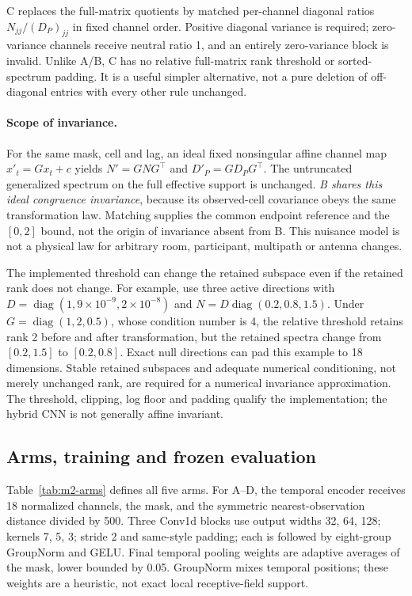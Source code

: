 C replaces the full-matrix quotients by matched per-channel diagonal ratios
$N_{jj}/(D_P)_{jj}$ in fixed channel order. Positive diagonal variance is
required; zero-variance channels receive neutral ratio 1, and an entirely
zero-variance block is invalid. Unlike A/B, C has no relative full-matrix
rank threshold or sorted-spectrum padding. It is a useful simpler alternative,
not a pure deletion of off-diagonal entries with every other rule unchanged.

\paragraph{Scope of invariance.}
For the same mask, cell and lag, an ideal fixed nonsingular affine channel
map $x'_t=Gx_t+c$ yields $N'=GNG^\top$ and $D'_P=GD_PG^\top$.
The untruncated generalized spectrum on the full effective support is
unchanged. \emph{B shares this ideal congruence invariance}, because its
observed-cell covariance obeys the same transformation law. Matching supplies
the common endpoint reference and the $[0,2]$ bound, not the origin of
invariance absent from B. This nuisance model is not a physical law for
arbitrary room, participant, multipath or antenna changes.

The implemented threshold can change the retained subspace even if the
retained rank does not change. For example, use three active directions with
$D=\operatorname{diag}(1,9\times10^{-9},2\times10^{-8})$ and
$N=D\operatorname{diag}(0.2,0.8,1.5)$. Under
$G=\operatorname{diag}(1,2,0.5)$, whose condition number is 4, the relative
threshold retains rank 2 before and after transformation, but the retained
spectra change from $[0.2,1.5]$ to $[0.2,0.8]$. Exact null directions can pad
this example to 18 dimensions. Stable retained subspaces and adequate numerical
conditioning, not merely unchanged rank, are required for a numerical
invariance approximation. The threshold, clipping, log floor and padding
qualify the implementation; the hybrid CNN is not generally affine invariant.

\subsection*{Arms, training and frozen evaluation}
Table~\ref{tab:m2-arms} defines all five arms. For A--D, the temporal encoder
receives 18 normalized channels, the mask, and the symmetric nearest-observation
distance divided by 500. Three Conv1d blocks use output widths 32, 64, 128;
kernels 7, 5, 3; stride 2 and same-style padding; each is followed by
eight-group GroupNorm and GELU. Final temporal pooling weights are adaptive
averages of the mask, lower bounded by 0.05. GroupNorm mixes temporal positions;
these weights are a heuristic, not exact local receptive-field support.

